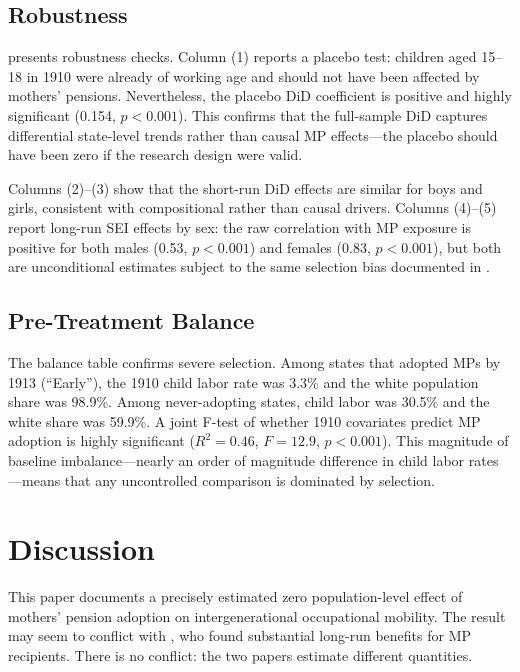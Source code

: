\documentclass[12pt]{article}
\begin{document}
\subsection{Robustness}



 presents robustness checks. Column (1) reports a placebo test: children aged 15--18 in 1910 were already of working age and should not have been affected by mothers' pensions. Nevertheless, the placebo DiD coefficient is positive and highly significant (0.154, $p < 0.001$). This confirms that the full-sample DiD captures differential state-level trends rather than causal MP effects---the placebo should have been zero if the research design were valid.

Columns (2)--(3) show that the short-run DiD effects are similar for boys and girls, consistent with compositional rather than causal drivers. Columns (4)--(5) report long-run SEI effects by sex: the raw correlation with MP exposure is positive for both males (0.53, $p < 0.001$) and females (0.83, $p < 0.001$), but both are unconditional estimates subject to the same selection bias documented in .

\subsection{Pre-Treatment Balance}

The balance table confirms severe selection. Among states that adopted MPs by 1913 (``Early''), the 1910 child labor rate was 3.3\% and the white population share was 98.9\%. Among never-adopting states, child labor was 30.5\% and the white share was 59.9\%. A joint F-test of whether 1910 covariates predict MP adoption is highly significant ($R^2 = 0.46$, $F = 12.9$, $p < 0.001$). This magnitude of baseline imbalance---nearly an order of magnitude difference in child labor rates---means that any uncontrolled comparison is dominated by selection.


\section{Discussion}

This paper documents a precisely estimated zero population-level effect of mothers' pension adoption on intergenerational occupational mobility. The result may seem to conflict with \citet{aizer2016}, who found substantial long-run benefits for MP recipients. There is no conflict: the two papers estimate different quantities.
\end{document}
